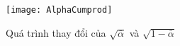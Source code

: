 \begin{figure}
	\texttt{[image: AlphaCumprod]}
	\label{fig:AlphaCumprod}
	\caption{Quá trình thay đổi của $\sqrt{\bar{\alpha}}$ và $\sqrt{1 - \bar{\alpha}}$}
\end{figure}






